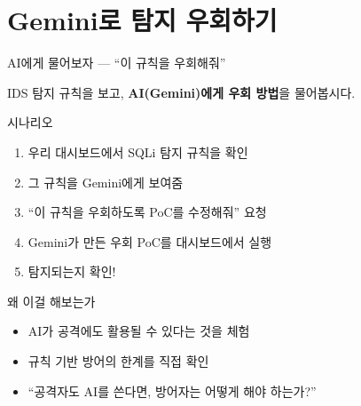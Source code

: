 \documentclass[aspectratio=169,10pt]{beamer}
\newcommand{\hlt}[1]{\textcolor{accent}{\textbf{#1}}}
\begin{document}
\section{Gemini로 탐지 우회하기}

\begin{frame}[shrink=5]{AI에게 물어보자 — ``이 규칙을 우회해줘''}

\begin{center}
\Large
IDS 탐지 규칙을 보고, \hlt{AI(Gemini)에게 우회 방법}을 물어봅시다.
\end{center}

\vspace{0.5em}
\begin{block}{시나리오}
\begin{enumerate}
    \item 우리 대시보드에서 SQLi 탐지 규칙을 확인
    \item 그 규칙을 Gemini에게 보여줌
    \item ``이 규칙을 우회하도록 PoC를 수정해줘'' 요청
    \item Gemini가 만든 우회 PoC를 대시보드에서 실행
    \item 탐지되는지 확인!
\end{enumerate}
\end{block}

\vspace{0.3em}
\begin{alertblock}{왜 이걸 해보는가}
\begin{itemize}
    \item AI가 공격에도 활용될 수 있다는 것을 체험
    \item 규칙 기반 방어의 한계를 직접 확인
    \item ``공격자도 AI를 쓴다면, 방어자는 어떻게 해야 하는가?''
\end{itemize}
\end{alertblock}
\end{frame}
\end{document}
